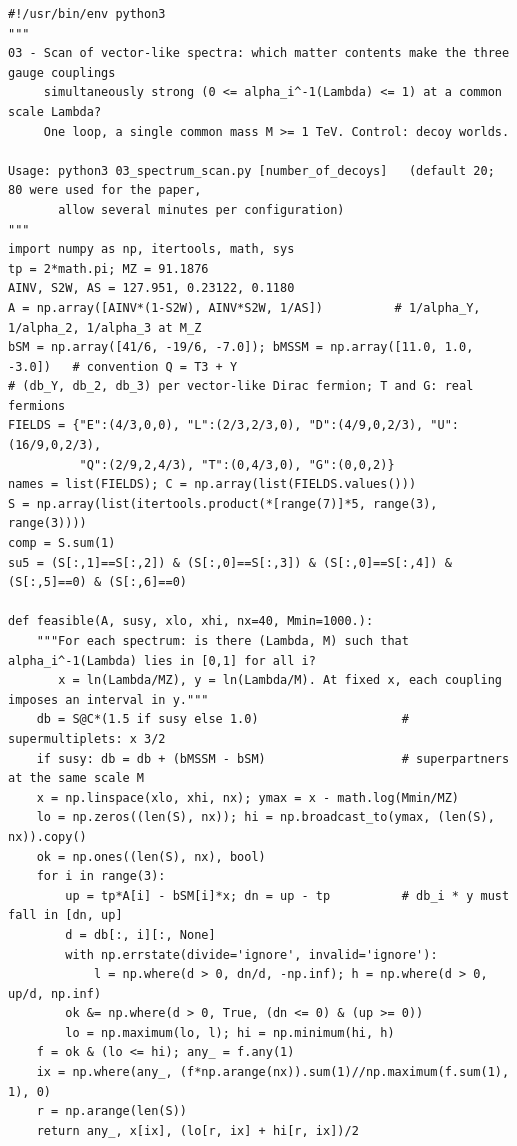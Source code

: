 \documentclass[11pt,a4paper]{article}
\begin{document}
\begin{lstlisting}
#!/usr/bin/env python3
"""
03 - Scan of vector-like spectra: which matter contents make the three gauge couplings
     simultaneously strong (0 <= alpha_i^-1(Lambda) <= 1) at a common scale Lambda?
     One loop, a single common mass M >= 1 TeV. Control: decoy worlds.

Usage: python3 03_spectrum_scan.py [number_of_decoys]   (default 20; 80 were used for the paper,
       allow several minutes per configuration)
"""
import numpy as np, itertools, math, sys
tp = 2*math.pi; MZ = 91.1876
AINV, S2W, AS = 127.951, 0.23122, 0.1180
A = np.array([AINV*(1-S2W), AINV*S2W, 1/AS])          # 1/alpha_Y, 1/alpha_2, 1/alpha_3 at M_Z
bSM = np.array([41/6, -19/6, -7.0]); bMSSM = np.array([11.0, 1.0, -3.0])   # convention Q = T3 + Y
# (db_Y, db_2, db_3) per vector-like Dirac fermion; T and G: real fermions
FIELDS = {"E":(4/3,0,0), "L":(2/3,2/3,0), "D":(4/9,0,2/3), "U":(16/9,0,2/3),
          "Q":(2/9,2,4/3), "T":(0,4/3,0), "G":(0,0,2)}
names = list(FIELDS); C = np.array(list(FIELDS.values()))
S = np.array(list(itertools.product(*[range(7)]*5, range(3), range(3))))
comp = S.sum(1)
su5 = (S[:,1]==S[:,2]) & (S[:,0]==S[:,3]) & (S[:,0]==S[:,4]) & (S[:,5]==0) & (S[:,6]==0)

def feasible(A, susy, xlo, xhi, nx=40, Mmin=1000.):
    """For each spectrum: is there (Lambda, M) such that alpha_i^-1(Lambda) lies in [0,1] for all i?
       x = ln(Lambda/MZ), y = ln(Lambda/M). At fixed x, each coupling imposes an interval in y."""
    db = S@C*(1.5 if susy else 1.0)                    # supermultiplets: x 3/2
    if susy: db = db + (bMSSM - bSM)                   # superpartners at the same scale M
    x = np.linspace(xlo, xhi, nx); ymax = x - math.log(Mmin/MZ)
    lo = np.zeros((len(S), nx)); hi = np.broadcast_to(ymax, (len(S), nx)).copy()
    ok = np.ones((len(S), nx), bool)
    for i in range(3):
        up = tp*A[i] - bSM[i]*x; dn = up - tp          # db_i * y must fall in [dn, up]
        d = db[:, i][:, None]
        with np.errstate(divide='ignore', invalid='ignore'):
            l = np.where(d > 0, dn/d, -np.inf); h = np.where(d > 0, up/d, np.inf)
        ok &= np.where(d > 0, True, (dn <= 0) & (up >= 0))
        lo = np.maximum(lo, l); hi = np.minimum(hi, h)
    f = ok & (lo <= hi); any_ = f.any(1)
    ix = np.where(any_, (f*np.arange(nx)).sum(1)//np.maximum(f.sum(1), 1), 0)
    r = np.arange(len(S))
    return any_, x[ix], (lo[r, ix] + hi[r, ix])/2


\end{lstlisting}
\end{document}
